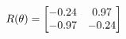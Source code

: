 \documentclass[preview]{standalone}
\begin{document}
\begin{align*}
\special{dvisvgm:raw <g id='unique000'>}R(\theta) = \begin{bmatrix}-0.24 & 0.97\\-0.97 & -0.24\end{bmatrix}\special{dvisvgm:raw </g>}
\end{align*}
\end{document}
